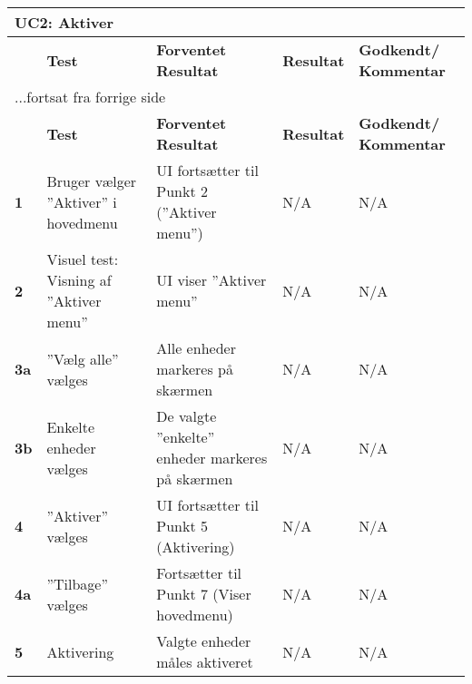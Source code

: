 
\begin{center}
\begin{longtable}{|p{}|p{}|p{}|p{}|p{}|} %
\hline
\multicolumn{5}{|l|}{\textbf{UC2: Aktiver}} \\ \hline
\multicolumn{1}{|c|}{} &
\textbf{Test} &
\textbf{Forventet \newline Resultat} &
\textbf{Resultat} &
\textbf{Godkendt/ \newline Kommentar} \\ \hline 
\endfirsthead

\multicolumn{5}{l}{...fortsat fra forrige side} \\ \hline 
\multicolumn{1}{|c|}{} &
\textbf{Test} &
\textbf{Forventet \newline Resultat} &
\textbf{Resultat} &
\textbf{Godkendt/ \newline Kommentar} \\ \hline 
\endhead

		
\textbf{1}			&Bruger vælger ''Aktiver'' i hovedmenu															
					&UI fortsætter til Punkt 2 (''Aktiver menu'')
					&N/A 
					&N/A \\\hline
					
\textbf{2}			&Visuel test: Visning af ''Aktiver menu''																
					&UI viser ''Aktiver menu''
					&N/A 
					&N/A \\\hline
		
\textbf{3a}			&''Vælg alle'' vælges		
					&Alle enheder markeres på skærmen		 	
					&N/A 
					&N/A \\\hline

\textbf{3b}			&Enkelte enheder vælges
					&De valgte ''enkelte'' enheder markeres på skærmen
					&N/A 
					&N/A \\\hline

\textbf{4}			&''Aktiver'' vælges			
					&UI fortsætter til Punkt 5 (Aktivering)
					&N/A 
					&N/A \\\hline
					
\textbf{4a}			&''Tilbage'' vælges			
					&Fortsætter til Punkt 7 (Viser hovedmenu)
					&N/A 
					&N/A \\\hline

\textbf{5}			&Aktivering			
					&Valgte enheder måles aktiveret
					&N/A 
					&N/A \\\hline
															

\end{longtable}
\end{center}
